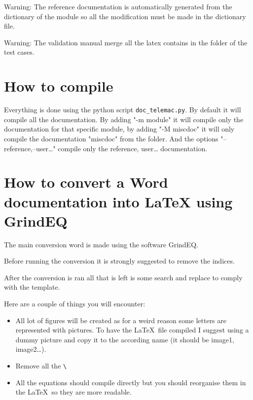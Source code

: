 \begin{WarningBlock}{Warning:}
The reference documentation is automatically generated from the dictionary of
the module so all the modification must be made in the dictionary file.
\end{WarningBlock}

\begin{WarningBlock}{Warning:}
The validation manual merge all the latex contains in the  folder
of the test cases.
\end{WarningBlock}

\section{How to compile}

Everything is done using the python script \verb!doc_telemac.py!. By default it will
compile all the documentation. By adding "-m module" it will compile only the
documentation for that specific module, by adding "-M miscdoc" it will only
compile the documentation "miscdoc" from the  folder. And the
options "--reference,--user\ldots" compile only the reference, user\ldots
documentation.

\section{How to convert a Word documentation into LaTeX using GrindEQ}

The main conversion word is made using the software GrindEQ.

Before running the conversion it is strongly suggested to remove the indices.

After the conversion is ran all that is left is some search and replace to
comply with the template.

Here are a couple of things you will encounter:
\begin{itemize}
\item All lot of figures will be created as for a weird reason some letters are
represented with pictures. To have the \LaTeX\ file compiled I suggest using a
dummy picture and copy it to the according name (it should be
image1, image2\ldots).
\item  Remove all the \verb!\!
\item All the equations should compile directly but you should reorganise them
in the \LaTeX\ so they are more readable.
\end{itemize}
